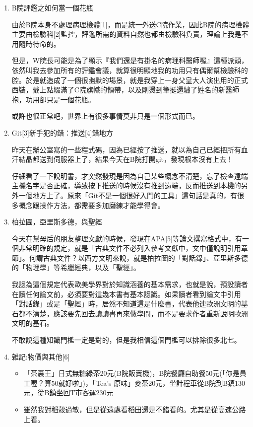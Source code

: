 \documentclass[a5paper, 12pt
]{book}
\providecommand{\tightlist}{%
  \setlength{\itemsep}{0pt}\setlength{\parskip}{0pt}}
\begin{document}
\begin{enumerate}
\def\labelenumi{\arabic{enumi}.}
\item
  B院評鑑之如何當一個花瓶

  由於B院本身不處理病理檢體{[}1{]}，而是統一外送C院作業，因此B院的病理檢體主要由檢驗科{[}2{]}監控，評鑑所需的資料自然也都由檢驗科負責，理論上我是不用隨時待命的。

  但是，W院長可能是為了顯示『我們還是有掛名的病理科醫師喔』這種派頭，依然叫我去參加所有的評鑑會議，就算很明顯地我的功用只有偶爾幫檢驗科的腔。於是就造成了一個很幽默的場景，就是我穿上一身父皇大人演出用的正式西裝，戴上點綴滿了C院旗幟的領帶，以及剛燙到筆挺還繡了姓名的新醫師袍，功用卻只是一個花瓶。

  或許也很正常吧，世界上有很多事情莫非只是一個形式而已。
\item
  Git{[}3{]}新手犯的錯：推送{[}4{]}錯地方

  昨天在辦公室寫的一些程式碼，因為已經按了推送，就以為自己已經把所有血汗結晶都送到伺服器上了，結果今天在B院打開git，發現根本沒有上去！

  仔細看了一下說明書，才突然發現是因為自己某些概念不清楚，忘了檢查遠端主機名字是否正確，導致按下推送的時候沒有推到遠端，反而推送到本機的另外一個地方上了。原來「Git不是一個很好入門的工具」這句話是真的，有很多概念跟操作方法，都需要多加磨練才能學得會。
\item
  柏拉圖，亞里斯多德，與聖經

  今天在幫母后的朋友整理文獻的時候，發現在APA{[}5{]}等論文撰寫格式中，有一個非常明確的規定，就是「古典文件不必列入參考文獻中，文中僅說明引用章節」。何謂古典文件？以西方文明來說，就是柏拉圖的「對話錄」、亞里斯多德的「物理學」等希臘經典，以及「聖經」。

  我認為這個規定代表歐美學界對於知識涵養的基本需求，也就是說，預設讀者在讀任何論文前，必須要對這幾本書有基本認識。如果讀者看到論文中引用「對話錄」或是「聖經」時，居然不知道這是什麼書，代表他連歐洲文明的基石都不清楚，應該要先回去讀讀書再來做學問，而不是要求作者重新說明歐洲文明的基石。

  不敢說這種知識門檻一定是對的，但是我相信這個門檻可以排除很多北七。
\item
  雜記:物價與其他{[}6{]}

  \begin{itemize}
  \tightlist
  \item
    「茶裏王」日式無糖綠茶20元(B院販賣機)，B院餐廳自助餐50元(「你是員工喔？算50就好啦」)，「Tea's
    原味」麥茶20元，坐計程車從B院到B鎮130元，從B鎮坐回T市客運230元
  \item
    雖然我對稻殼過敏，但是從遠處看稻田還是不錯看的。尤其是從高速公路上看。
  \end{itemize}
\end{enumerate}
\end{document}
